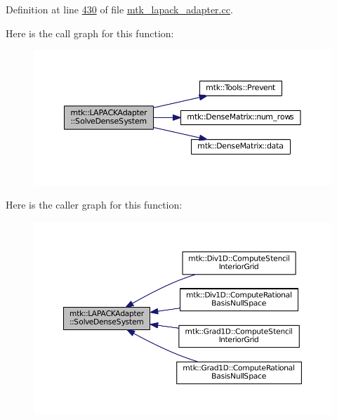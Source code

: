 Definition at line \hyperlink{mtk__lapack__adapter_8cc_source_l00430}{430} of file \hyperlink{mtk__lapack__adapter_8cc_source}{mtk\+\_\+lapack\+\_\+adapter.\+cc}.



Here is the call graph for this function\+:\nopagebreak
\begin{figure}[H]
\begin{center}
\leavevmode
\includegraphics[width=350pt]{classmtk_1_1LAPACKAdapter_a7428bccf74fd4a4af68fb7233846da22_cgraph}
\end{center}
\end{figure}




Here is the caller graph for this function\+:\nopagebreak
\begin{figure}[H]
\begin{center}
\leavevmode
\includegraphics[width=350pt]{classmtk_1_1LAPACKAdapter_a7428bccf74fd4a4af68fb7233846da22_icgraph}
\end{center}
\end{figure}


